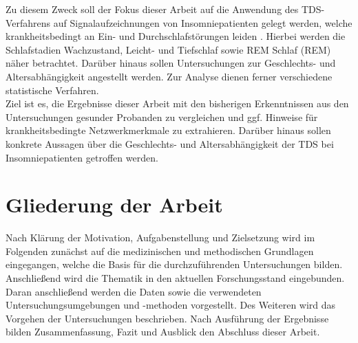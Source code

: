 \newpage

Zu diesem Zweck soll der Fokus dieser Arbeit auf die Anwendung des \acs{TDS}-Verfahrens auf Signalaufzeichnungen von Insomniepatienten gelegt werden, welche krankheitsbedingt an Ein- und Durchschlafstörungen leiden \parencite{mayer_s3-leitlinie_2009}. Hierbei werden die Schlafstadien Wachzustand, Leicht- und Tiefschlaf sowie \acl{REM} Schlaf (\acs{REM}) näher betrachtet. Darüber hinaus sollen Untersuchungen zur Geschlechts- und Altersabhängigkeit angestellt werden. Zur Analyse dienen ferner verschiedene statistische Verfahren.\\

Ziel ist es, die Ergebnisse dieser Arbeit mit den bisherigen Erkenntnissen aus den Untersuchungen gesunder Probanden zu vergleichen und ggf. Hinweise für krankheitsbedingte Netzwerkmerkmale zu extrahieren. Darüber hinaus sollen konkrete Aussagen über die Geschlechts- und Altersabhängigkeit der \acs{TDS} bei Insomniepatienten getroffen werden. 

\section{Gliederung der Arbeit}

Nach Klärung der Motivation, Aufgabenstellung und Zielsetzung wird im Folgenden zunächst auf die medizinischen und methodischen Grundlagen eingegangen, welche die Basis für die durchzuführenden Untersuchungen bilden. Anschließend wird die Thematik in den aktuellen Forschungsstand eingebunden. Daran anschließend werden die Daten sowie die verwendeten Untersuchungsumgebungen und -methoden vorgestellt. Des Weiteren wird das Vorgehen der Untersuchungen beschrieben. Nach Ausführung der Ergebnisse bilden Zusammenfassung, Fazit und Ausblick den Abschluss dieser Arbeit. 